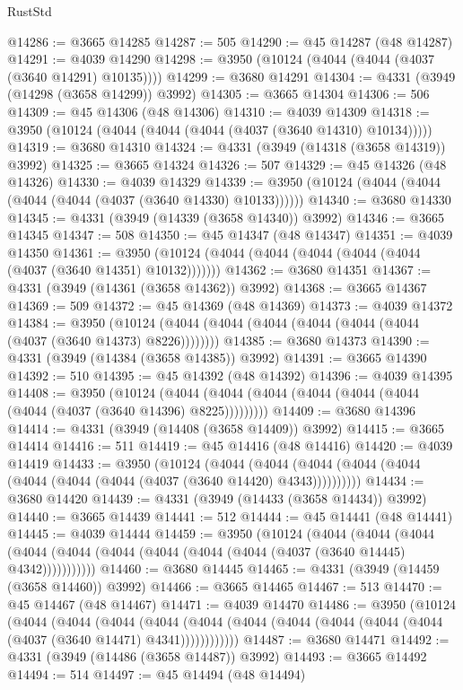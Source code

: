 \begin{lexlean}{RustStd}
\begin{coremodule}
@14286 := @3665 @14285
@14287 := 505
@14290 := @45 @14287 (@48 @14287)
@14291 := @4039 @14290
@14298 := @3950 (@10124 (@4044 (@4044 (@4037 (@3640 @14291) @10135))))
@14299 := @3680 @14291
@14304 := @4331 (@3949 (@14298 (@3658 @14299)) @3992)
@14305 := @3665 @14304
@14306 := 506
@14309 := @45 @14306 (@48 @14306)
@14310 := @4039 @14309
@14318 := @3950 (@10124 (@4044 (@4044 (@4044 (@4037 (@3640 @14310) @10134)))))
@14319 := @3680 @14310
@14324 := @4331 (@3949 (@14318 (@3658 @14319)) @3992)
@14325 := @3665 @14324
@14326 := 507
@14329 := @45 @14326 (@48 @14326)
@14330 := @4039 @14329
@14339 := @3950 (@10124 (@4044 (@4044 (@4044 (@4044 (@4037 (@3640 @14330) @10133))))))
@14340 := @3680 @14330
@14345 := @4331 (@3949 (@14339 (@3658 @14340)) @3992)
@14346 := @3665 @14345
@14347 := 508
@14350 := @45 @14347 (@48 @14347)
@14351 := @4039 @14350
@14361 := @3950 (@10124 (@4044 (@4044 (@4044 (@4044 (@4044 (@4037 (@3640 @14351) @10132)))))))
@14362 := @3680 @14351
@14367 := @4331 (@3949 (@14361 (@3658 @14362)) @3992)
@14368 := @3665 @14367
@14369 := 509
@14372 := @45 @14369 (@48 @14369)
@14373 := @4039 @14372
@14384 := @3950
    (@10124 (@4044 (@4044 (@4044 (@4044 (@4044 (@4044 (@4037 (@3640 @14373) @8226))))))))
@14385 := @3680 @14373
@14390 := @4331 (@3949 (@14384 (@3658 @14385)) @3992)
@14391 := @3665 @14390
@14392 := 510
@14395 := @45 @14392 (@48 @14392)
@14396 := @4039 @14395
@14408 := @3950
    (@10124 (@4044 (@4044 (@4044 (@4044 (@4044 (@4044 (@4044 (@4037 (@3640 @14396) @8225)))))))))
@14409 := @3680 @14396
@14414 := @4331 (@3949 (@14408 (@3658 @14409)) @3992)
@14415 := @3665 @14414
@14416 := 511
@14419 := @45 @14416 (@48 @14416)
@14420 := @4039 @14419
@14433 := @3950
    (@10124
      (@4044 (@4044 (@4044 (@4044 (@4044 (@4044 (@4044 (@4044 (@4037 (@3640 @14420) @4343))))))))))
@14434 := @3680 @14420
@14439 := @4331 (@3949 (@14433 (@3658 @14434)) @3992)
@14440 := @3665 @14439
@14441 := 512
@14444 := @45 @14441 (@48 @14441)
@14445 := @4039 @14444
@14459 := @3950
    (@10124
      (@4044
        (@4044
          (@4044 (@4044 (@4044 (@4044 (@4044 (@4044 (@4044 (@4037 (@3640 @14445) @4342)))))))))))
@14460 := @3680 @14445
@14465 := @4331 (@3949 (@14459 (@3658 @14460)) @3992)
@14466 := @3665 @14465
@14467 := 513
@14470 := @45 @14467 (@48 @14467)
@14471 := @4039 @14470
@14486 := @3950
    (@10124
      (@4044
        (@4044
          (@4044
            (@4044 (@4044 (@4044 (@4044 (@4044 (@4044 (@4044 (@4037 (@3640 @14471) @4341))))))))))))
@14487 := @3680 @14471
@14492 := @4331 (@3949 (@14486 (@3658 @14487)) @3992)
@14493 := @3665 @14492
@14494 := 514
@14497 := @45 @14494 (@48 @14494)

\end{coremodule}
\end{lexlean}
